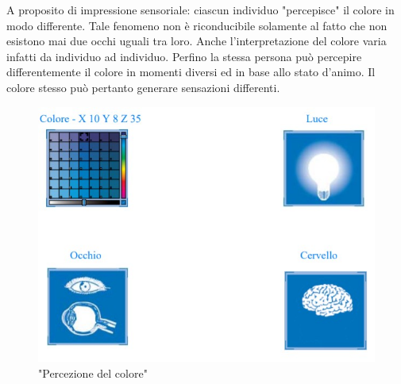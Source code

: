 \documentclass[a4paper,11pt]{article}
\begin{document}
        A proposito di impressione sensoriale: ciascun individuo "percepisce" il colore in modo
        differente. Tale fenomeno non è riconducibile solamente al fatto che non esistono mai due occhi
        uguali tra loro. Anche l’interpretazione del colore varia infatti da individuo ad individuo.
        Perfino la stessa persona può percepire differentemente il colore in momenti diversi ed in base
        allo stato d’animo. Il colore stesso può pertanto generare sensazioni differenti. 

        \begin{figure}[h]
            \centering
            \includegraphics[scale=0.8]{colorimetria1}
            \caption{"Percezione del colore"}
        \end{figure}
        \newpage
\end{document}
